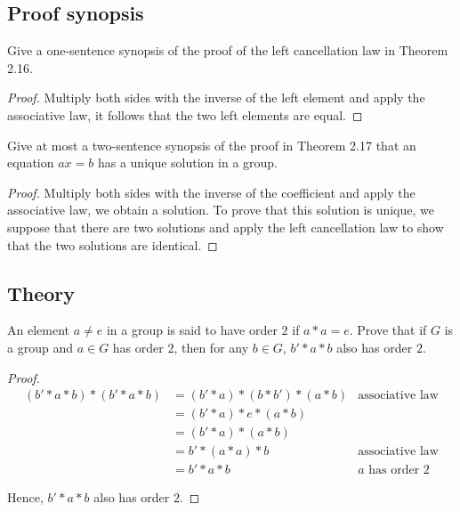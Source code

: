 \subsection*{Proof synopsis}

\begin{exercise}
    Give a one-sentence synopsis of the proof of the left cancellation law in Theorem 2.16.
\end{exercise}

\begin{proof}
    Multiply both sides with the inverse of the left element and apply the associative law, it follows that the two left elements are equal.
\end{proof}

\begin{exercise}
    Give at most a two-sentence synopsis of the proof in Theorem 2.17 that an equation $ax = b$ has a unique solution in a group.
\end{exercise}

\begin{proof}
    Multiply both sides with the inverse of the coefficient and apply the associative law, we obtain a solution. To prove that this solution is unique, we suppose that there are two solutions and apply the left cancellation law to show that the two solutions are identical.
\end{proof}

\subsection*{Theory}

\begin{exercise}
    An element $a\ne e$ in a group is said to have order $2$ if $a * a = e$. Prove that if $G$ is a group and $a\in G$ has order $2$, then for any $b\in G$, $b' * a * b$ also has order $2$.
\end{exercise}

\begin{proof}
    \begin{align*}
        (b' * a * b) * (b' * a * b) & = (b' * a) * (b * b') * (a * b) & \text{associative law}   \\
                                    & = (b' * a) * e * (a * b)                                   \\
                                    & = (b' * a) * (a * b)                                       \\
                                    & = b' * (a * a) * b              & \text{associative law}   \\
                                    & = b' * a * b                    & \text{$a$ has order $2$}
    \end{align*}

    Hence, $b' * a * b$ also has order $2$.
\end{proof}

